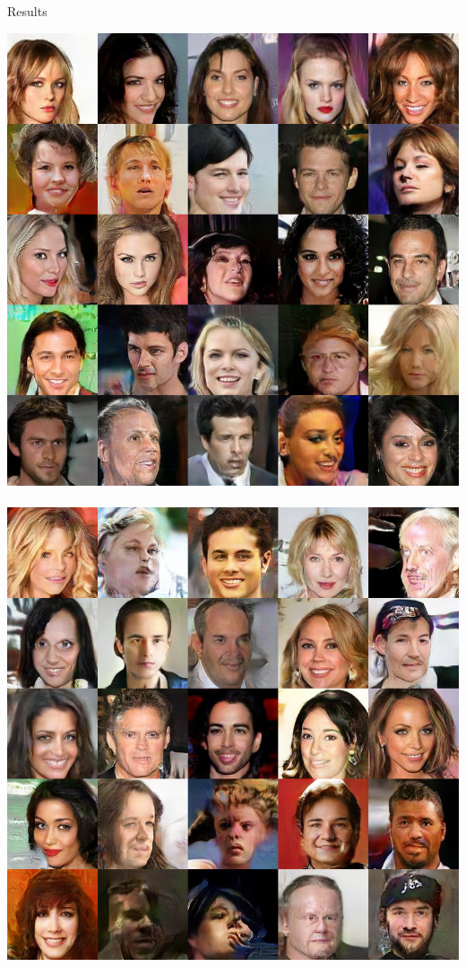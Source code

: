 \documentclass[xcolor={table}]{beamer}
\begin{document}
\begin{frame}{}
\begin{columns}[T, totalwidth=\textwidth]
\begin{column}{.32\textwidth}
\begin{block}{Results}
    \end{block}
    \vspace*{-1.3cm}
    \begin{sidefigure4}
      \centering
      \includegraphics[width=.49\columnwidth]{samples/celeba-mmd-rq-25.png}
      ~
      \includegraphics[width=.49\columnwidth]{samples/celeba-wgan-25.png}
      \vspace*{10pt}

\end{sidefigure4}
\end{column}
\end{columns}
\end{frame}
\end{document}
